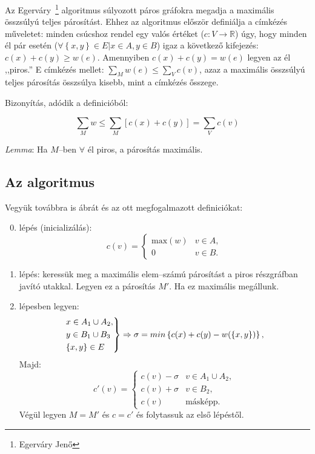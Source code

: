 Az Egerváry~\footnote{Egerváry Jenő} algoritmus súlyozott páros gráfokra megadja
a maximális összsúlyú teljes párosítást. Ehhez az algoritmus először definiálja
a címkézés műveletet: minden csúcshoz rendel egy valós értéket ($c:V \rightarrow
\mathbb{R}$) úgy, hogy minden él pár esetén ($\forall \left\{x,y\right\} \in E |
x \in A, y \in B$) igaz a következő kifejezés: $c(x)+c(y) \geq w(e)$. Amennyiben
$c(x)+c(y)=w(e)$ legyen az él ,,piros.'' E címkézés mellet: $\sum_Mw(e) \leq
\sum_Vc(v)$, azaz a maximális összsúlyú teljes párosítás összsúlya kisebb, mint
a címkézés ősszege.

Bizonyítás, adódik a definicióból:

\begin{displaymath}
\sum_M{w} \leq \sum_M{\left[c(x)+c(y)\right]} = \sum_V{c(v)}
\end{displaymath}

\emph{Lemma}: Ha $M$--ben $\forall$ él piros, a párosítás maximális.

\subsection{Az algoritmus}

Vegyük továbbra is  ábrát és az ott megfogalmazott definiciókat:

\begin{enumerate}
  \setcounter{enumi}{-1}
  \item lépés (inicializálás):   \begin{displaymath}
  c(v)=\begin{cases}
  \mbox{max}(w) & v \in A, \\
  0             & v \in B.
  \end{cases} 
  \end{displaymath}
  \item lépés: keressük meg a maximális elem--számú párosítást a piros részgráfban
  javító utakkal.
  Legyen ez a párosítás $M'$. Ha ez maximális megállunk.
  \item lépesben legyen:
  \begin{displaymath}
  \begin{rcases}
  x \in A_1 \cup A_2, \\
  y \in B_1 \cup B_3\\
  \{x,y\} \in E
  \end{rcases}
  \Rightarrow \sigma= min\left\{c(x) + c(y) - w(\left\{x,y\right\}) \right\},
  \end{displaymath}
  Majd: \begin{displaymath}
  c'(v)=\begin{cases}
  c(v)-\sigma & v \in A_1 \cup A_2, \\
  c(v)+\sigma & v \in B_2, \\
  c(v) 		   &  \mbox{másképp.}
  \end{cases} 
  \end{displaymath}
  Végül legyen $M=M'$ és $c=c'$ és folytassuk az első lépéstől.
\end{enumerate} 

